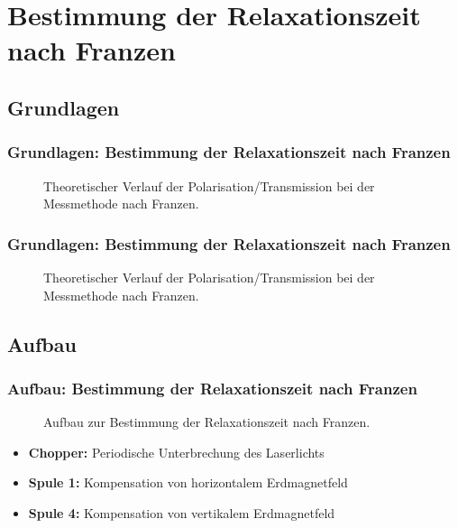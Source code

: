 
\section{Bestimmung der Relaxationszeit nach Franzen}
\subsection{Grundlagen}

\begin{frame}
\frametitle{Grundlagen: Bestimmung der Relaxationszeit nach Franzen}

\begin{figure}
    \centering
    \def\svgwidth{\textwidth}
    
    \caption{Theoretischer Verlauf der Polarisation/Transmission bei der Messmethode nach Franzen.}
\end{figure}

  
\end{frame}


\begin{frame}[noframenumbering]
\frametitle{Grundlagen: Bestimmung der Relaxationszeit nach Franzen}

\addtocounter{figure}{-1}
\begin{figure}
    \centering
    \def\svgwidth{\textwidth}
    
    \caption{Theoretischer Verlauf der Polarisation/Transmission bei der Messmethode nach Franzen.}
\end{figure}

  
\end{frame}

\subsection{Aufbau}
\begin{frame}
\frametitle{Aufbau: Bestimmung der Relaxationszeit nach Franzen}

\begin{figure}
    \centering
    \def\svgwidth{\textwidth}
    
    \caption{Aufbau zur Bestimmung der Relaxationszeit nach Franzen.}
\end{figure}

\begin{itemize}
  \item \textbf{Chopper:} Periodische Unterbrechung des Laserlichts
  \item \textbf{Spule 1:} Kompensation von horizontalem Erdmagnetfeld
  \item \textbf{Spule 4:} Kompensation von vertikalem Erdmagnetfeld
\end{itemize}

\end{frame}

